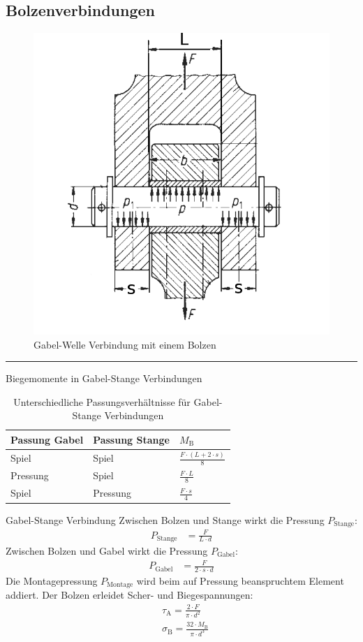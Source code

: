 \subsection{Bolzenverbindungen}
\begin{figure}[H]
	\centering
	\includegraphics[width=0.7\linewidth]{bolzen-und-stiftverbindungen/bolzen}
	\caption*{Gabel-Welle Verbindung mit einem Bolzen}
\end{figure}
\vfill
\pagebreak
\hrule
\begin{eeqn}{Biegemomente in Gabel-Stange Verbindungen}
	\begin{table}[H]
		\centering
		\caption*{Unterschiedliche Passungsverhältnisse für Gabel-Stange Verbindungen}
		\begin{tabularx}{\linewidth}{llX}
			\toprule
			Passung Gabel & Passung Stange & $M_\text{B}$ \\
			\midrule
			Spiel & Spiel & $\displaystyle\frac{F\cdot (L+2\cdot s)}{8}$ \\[3mm]
			Pressung & Spiel & $\displaystyle\frac{F \cdot L}{8} $ \\[3mm]
			Spiel & Pressung & $\displaystyle\frac{F\cdot s}{4} $ \\
			\bottomrule
		\end{tabularx}
	\end{table}
\end{eeqn}

\begin{eeqn}{Gabel-Stange Verbindung}
	Zwischen Bolzen und Stange wirkt die Pressung $P_\text{Stange}$:
	\begin{align}
		P_\text{Stange} &= \frac{F}{L\cdot d}
	\end{align}
	Zwischen Bolzen und Gabel wirkt die Pressung $P_\text{Gabel}$:
	\begin{align}
		P_\text{Gabel} &= \frac{F}{2 \cdot s \cdot d}
	\end{align}
	Die Montagepressung $P_\text{Montage}$ wird beim auf Pressung beanspruchtem Element addiert.
	Der Bolzen erleidet Scher- und Biegespannungen:
	\begin{align}
		& \tau_\text{A} = \frac{2\cdot F}{\pi \cdot d^2} \\
		& \sigma_\text{B} = \frac{32\cdot M_\text{B}}{\pi \cdot d^3}
	\end{align}
\end{eeqn}

